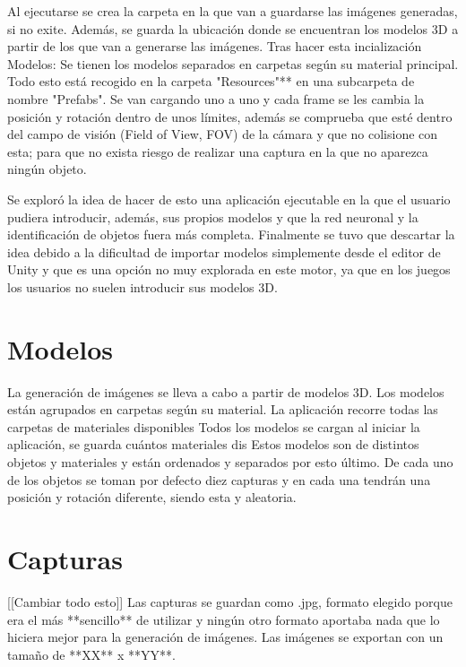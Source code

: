 Al ejecutarse se crea la carpeta en la que van a guardarse las imágenes generadas, si no exite. Además, se guarda la ubicación donde se encuentran los modelos 3D a partir de los que van a generarse las imágenes. Tras hacer esta incialización
		Modelos:
Se tienen los modelos separados en carpetas según su material principal. Todo esto está recogido en la carpeta "Resources"** en una subcarpeta de nombre "Prefabs". Se van cargando uno a uno y cada frame se les cambia la posición y rotación dentro de unos límites, además se comprueba que esté dentro del campo de visión (Field of View, FOV) de la cámara y que no colisione con esta; para que no exista riesgo de realizar una captura en la que no aparezca ningún objeto. 


Se exploró la idea de hacer de esto una aplicación ejecutable en la que el usuario pudiera introducir, además, sus propios modelos y que la red neuronal y la identificación de objetos fuera más completa. Finalmente se tuvo que descartar la idea debido a la dificultad de importar modelos simplemente desde el editor de Unity y que es una opción no muy explorada en este motor, ya que en los juegos los usuarios no suelen introducir sus modelos 3D.


\section{Modelos}
\label{cap3:sec:modelos}

La generación de imágenes se lleva a cabo a partir de modelos 3D. Los modelos están agrupados en carpetas según su material.
La aplicación recorre todas las carpetas de materiales disponibles
 Todos los modelos se cargan al iniciar la aplicación, se guarda cuántos materiales dis Estos modelos son de distintos objetos y materiales y están ordenados y separados por esto último. 
De cada uno de los objetos se toman por defecto diez capturas y en cada una tendrán una posición y rotación diferente, siendo esta y aleatoria.

\section{Capturas}
\label{cap3:sec:capturas}

[[Cambiar todo esto]] 
Las capturas se guardan como .jpg, formato elegido porque era el más **sencillo** de utilizar y ningún otro formato aportaba nada que lo hiciera mejor para la generación de imágenes. Las imágenes se exportan con un tamaño de **XX** x **YY**. 

